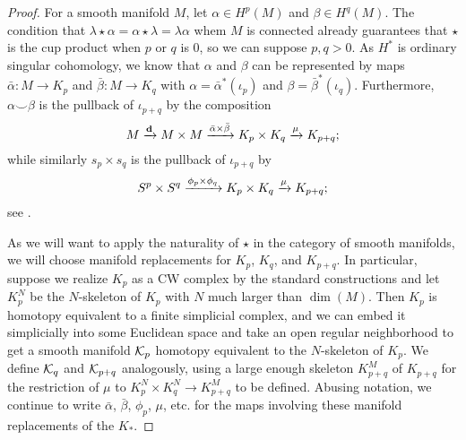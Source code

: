 \begin{proof}
	For a smooth manifold $M$, let $\alpha \in H^p(M)$ and $\beta \in H^q(M)$.
	The condition that $\lambda\star \alpha = \alpha\star \lambda = \lambda\alpha$ whem $M$ is connected already guarantees that $\star$ is the cup product when $p$ or $q$ is $0$, so we can suppose $p,q>0$.
	As $H^*$ is ordinary singular cohomology, we know that $\alpha$ and $\beta$ can be represented by maps $\bar \alpha \colon M \to K_p$ and $\bar\beta \colon M \to K_q$ with $\alpha = \bar \alpha^*(\iota_p)$ and $\beta = \bar\beta^*(\iota_q)$.
	Furthermore, $\alpha\smile \beta$ is the pullback of $\iota_{p+q}$ by the composition
	\begin{equation}\label{E: EM cross}
		M \xrightarrow{\mathbf{d}} M \times M \xrightarrow{\bar\alpha \times \bar \beta} K_p \times K_q \xrightarrow{\mu} K_{p+q};
	\end{equation}
	while similarly $s_p \times s_q$ is the pullback of $\iota_{p+q}$ by
	\begin{equation}\label{E: sphere cross}
		S^p \times S^q \xrightarrow{\phi_p \times \phi_q} K_p \times K_q \xrightarrow{\mu} K_{p+q};
	\end{equation}
	see \cite[Section 4.3]{Hatc02}.

	As we will want to apply the naturality of $\star$ in the category of smooth manifolds, we will choose manifold replacements for $K_p$, $K_q$, and $K_{p+q}$.
	In particular, suppose we realize $K_p$ as a CW complex by the standard constructions and let $K_p^N$ be the $N$-skeleton of $K_p$ with $N$ much larger than $\dim(M)$.
	Then $K_p$ is homotopy equivalent to a finite simplicial complex, and we can embed it simplicially into some Euclidean space and take an open regular neighborhood to get a smooth manifold $\mathcal{K}_p$ homotopy equivalent to the $N$-skeleton of $K_p$.
	We define $\mathcal{K}_q$ and $\mathcal{K}_{p+q}$ analogously, using a large enough skeleton $K^M_{p+q}$ of $K_{p+q}$ for the restriction of $\mu$ to $K_p^N \times K_q^N \to K_{p+q}^M$ to be defined.
	Abusing notation, we continue to write $\bar \alpha$, $\bar \beta$, $\phi_p$, $\mu$, etc.
	for the maps involving these manifold replacements of the $K_*$.


\end{proof}
